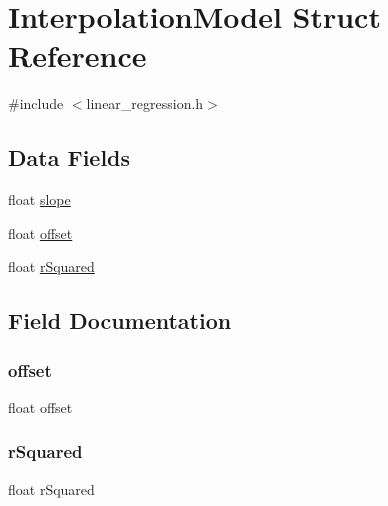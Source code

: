 \hypertarget{struct_interpolation_model}{}\section{Interpolation\+Model Struct Reference}
\label{struct_interpolation_model}


{\ttfamily \#include $<$linear\+\_\+regression.\+h$>$}

\subsection*{Data Fields}
\begin{DoxyCompactItemize}
\item 
float \hyperlink{struct_interpolation_model_a837fbee09614bc161b1e2108f2ce43d3}{slope}
\item 
float \hyperlink{struct_interpolation_model_a3e60b3c561be982d7c8e23f14c01fd5b}{offset}
\item 
float \hyperlink{struct_interpolation_model_a2cb45d2e151dad6c76533a4567745c84}{r\+Squared}
\end{DoxyCompactItemize}


\subsection{Field Documentation}
\mbox{\label{struct_interpolation_model_a3e60b3c561be982d7c8e23f14c01fd5b}} 
\subsubsection{\texorpdfstring{offset}{offset}}
{\footnotesize\ttfamily float offset}

\mbox{\label{struct_interpolation_model_a2cb45d2e151dad6c76533a4567745c84}} 
\subsubsection{\texorpdfstring{r\+Squared}{rSquared}}
{\footnotesize\ttfamily float r\+Squared}

